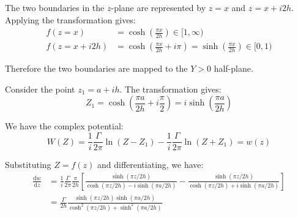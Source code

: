 \documentclass[12pt]{article}
\begin{document}

The two boundaries in the $z$-plane are represented by $z = x$ and $z = x + i2h$. Applying the transformation gives:
\begin{equation}
    \begin{split}
        f(z = x) &= \cosh{\left( \frac{\pi x}{2h} \right)} \in [1, \infty) \\
        f(z = x + i2h) &= \cosh{\left( \frac{\pi x}{2h} + i\pi \right)} = \sinh{\left( \frac{\pi x}{2h} \right)} \in [0, 1)
    \end{split}
\end{equation}

Therefore the two boundaries are mapped to the $Y > 0$ half-plane.

Consider the point $z_{1} = a + ih$. The transformation gives:
\begin{equation}
    Z_{1} = \cosh{\left( \frac{\pi a}{2h} + i\frac{\pi}{2} \right)} = i\sinh{\left( \frac{\pi a}{2h} \right)}
\end{equation}

We have the complex potential:
\begin{equation}
    W(Z) = \frac{1}{i} \frac{\Gamma}{2\pi} \ln{(Z - Z_{1})} - \frac{1}{i} \frac{\Gamma}{2\pi} \ln{(Z + Z_{1})} = w(z)
\end{equation}

Substituting $Z = f(z)$ and differentiating, we have:
\begin{equation}
    \begin{split}
        \frac{\mathrm{d}w}{\mathrm{d}z} &= \frac{1}{i} \frac{\Gamma}{2\pi} \frac{\pi}{2h} \left[ \frac{\sinh{(\pi z/2h)}}{\cosh{(\pi z/2h)} - i\sinh{(\pi a/2h)}} - \frac{\sinh{(\pi z/2h)}}{\cosh{(\pi z/2h)} + i\sinh{(\pi a/2h)}} \right] \\
        &= \frac{\Gamma}{2h} \frac{\sinh{(\pi z/2h)} \sinh{(\pi a/2h)}}{\cosh^{2}{(\pi z/2h)} + \sinh^{2}{(\pi a/2h)}}
    \end{split}
\end{equation}
\end{document}
